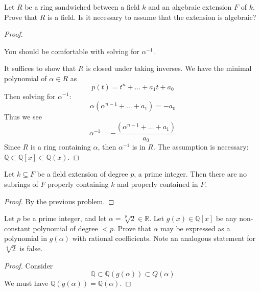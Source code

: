 \documentclass[openany]{book}
\newcommand{\Q}{\mathbb{Q}}
\begin{document}
\begin{prob}
Let \( R \) be a ring sandwiched between a field \( k \) and an algebraic extension \( F \) of \( k \). Prove that \( R \) is a field. Is it necessary to assume that the extension is algebraic? 
\end{prob}
\begin{proof}
    \begin{warn}
        You should be comfortable with solving for $\alpha^{-1}$.
    \end{warn}
    It suffices to show that $R$ is closed under taking inverses. We have the minimal polynomial of $\alpha\in R$ as 
    \begin{equation*}
        p(t)=t^n+\dots +a_1t+a_0
    \end{equation*}
    Then solving for $\alpha^{-1}$: 
    \begin{equation*}
        \alpha(\alpha^{n-1}+\dots+a_1)=-a_0
    \end{equation*}
    Thus we see 
    \begin{equation*}
        \alpha^{-1}=-\frac{(\alpha^{n-1}+\dots+a_1)}{a_0}
    \end{equation*}
    Since $R$ is a ring containing $\alpha$, then $\alpha^{-1}$ is in $R$. The assumption is necessary: $\Q\subset\Q[x]\subset\Q(x)$.
\end{proof}

\begin{prop}
Let \( k \subseteq F \) be a field extension of degree \( p \), a prime integer. Then there are no subrings of \( F \) properly containing \( k \) and properly contained in \( F \).
\end{prop}
\begin{proof}
    By the previous problem.
\end{proof}

\begin{prob}
Let \( p \) be a prime integer, and let \( \alpha = \sqrt[p]{2} \in \mathbb{R} \). Let \( g(x) \in \mathbb{Q}[x] \) be any non-constant polynomial of degree \( <p \). Prove that \( \alpha \) may be expressed as a polynomial in \( g(\alpha) \) with rational coefficients.  Note an analogous statement for \( \sqrt[4]{2} \) is false.
\end{prob}
\begin{proof}
    Consider 
    \begin{equation*}
        \Q\subset\Q(g(\alpha))\subset Q(\alpha)
    \end{equation*}
    We must have $\Q(g(\alpha))=\Q(\alpha)$. 
\end{proof}
\end{document}
